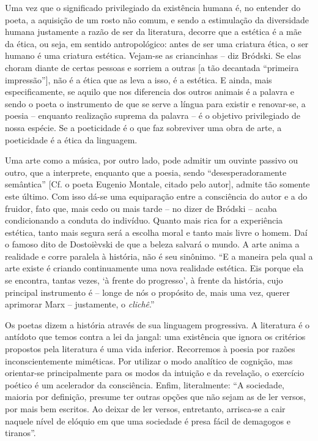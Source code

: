 Uma vez que o significado privilegiado da existência humana é, no
entender do poeta, a aquisição de um rosto não comum, e sendo a
estimulação da diversidade humana justamente a razão de ser da
literatura, decorre que a estética é a mãe da ética, ou seja, em sentido
antropológico: antes de ser uma criatura ética, o ser humano é uma
criatura estética. Vejam-se as criancinhas -- diz Bródski. Se elas
choram diante de certas pessoas e sorriem a outras {[}a tão decantada
``primeira impressão''{]}, não é a ética que as leva a isso, é a
estética. E ainda, mais especificamente, se aquilo que nos diferencia
dos outros animais é a palavra e sendo o poeta o instrumento de que se
serve a língua para existir e renovar-se, a poesia -- enquanto
realização suprema da palavra -- é o objetivo privilegiado de nossa
espécie. Se a poeticidade é o que faz sobreviver uma obra de arte, a
poeticidade é a ética da linguagem.

Uma arte como a música, por outro lado, pode admitir um ouvinte passivo
ou outro, que a interprete, enquanto que a poesia, sendo
``desesperadoramente semântica'' {[}Cf. o poeta Eugenio Montale, citado
pelo autor{]}, admite tão somente este último. Com isso dá-se uma
equiparação entre a consciência do autor e a do fruidor, fato que, mais
cedo ou mais tarde -- no dizer de Bródski -- acaba condicionando a
conduta do indivíduo. Quanto mais rica for a experiência estética, tanto
mais segura será a escolha moral e tanto mais livre o homem. Daí o
famoso dito de Dostoièvski de que a beleza salvará o mundo. A arte anima
a realidade e corre paralela à história, não é seu sinônimo. ``E a
maneira pela qual a arte existe é criando continuamente uma nova
realidade estética. Eis porque ela se encontra, tantas vezes, `à frente
do progresso', à frente da história, cujo principal instrumento é --
longe de nós o propósito de, mais uma vez, querer aprimorar Marx --
justamente, o \emph{clichê}.''

Os poetas dizem a história através de sua linguagem progressiva. A
literatura é o antídoto que temos contra a lei da jangal: uma existência
que ignora os critérios propostos pela literatura é uma vida inferior.
Recorremos à poesia por razões inconscientemente miméticas. Por utilizar
o modo analítico de cognição, mas orientar-se principalmente para os
modos da intuição e da revelação, o exercício poético é um acelerador da
consciência. Enfim, literalmente: ``A sociedade, maioria por definição,
presume ter outras opções que não sejam as de ler versos, por mais bem
escritos. Ao deixar de ler versos, entretanto, arrisca-se a cair naquele
nível de elóquio em que uma sociedade é presa fácil de demagogos e
tiranos''.

